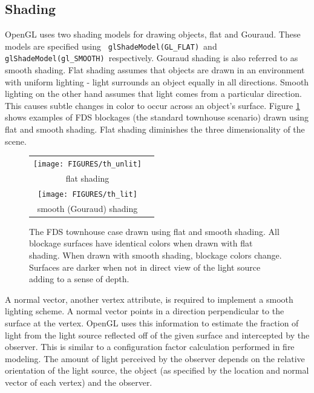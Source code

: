\documentclass[11pt,twoside]{book}
\begin{document}
\subsection{Shading} OpenGL uses two shading models for drawing
objects, flat and Gouraud.  These models are specified using {\tt
glShadeModel(GL\_FLAT)}\ and {\tt glShadeModel(gl\_SMOOTH)}\
respectively. Gouraud shading is also referred to as smooth
shading.  Flat shading assumes that objects are drawn in an
environment with uniform lighting - light surrounds an object
equally in all directions. Smooth lighting on the other hand
assumes that light comes from a particular direction.  This causes
subtle changes in color to occur across an object's surface.
Figure \ref{figlighting} shows examples of FDS blockages (the
standard townhouse scenario) drawn using flat and smooth shading.
Flat shading diminishes the three dimensionality of the scene.
\begin{figure}[\figoptions]
\begin{center}
\begin{tabular}{cc}
\texttt{[image: FIGURES/th\_unlit]}\\
flat shading\\
\texttt{[image: FIGURES/th\_lit]}\\
smooth (Gouraud) shading\\
\end{tabular}
\end{center}
\caption [The FDS townhouse case drawn using flat and smooth
shading.] { The FDS townhouse case drawn using flat and smooth
shading. All blockage surfaces have identical colors when drawn
with flat shading.  When drawn with smooth shading, blockage
colors change.  Surfaces are darker when not in direct view of the
light source adding to a sense of depth. } \label{figlighting}
\end{figure}

A normal vector, another vertex attribute, is required to
implement a smooth lighting scheme. A normal vector points in a
direction perpendicular to the surface at the vertex. OpenGL uses
this information to estimate the fraction of light from the light
source reflected off of the given surface and intercepted by the
observer.  This is similar to a configuration factor calculation
performed in fire modeling.  The amount of light perceived by the
observer depends on the relative orientation of the light source,
the object (as specified by the location and normal vector of each
vertex) and the observer.
\end{document}
